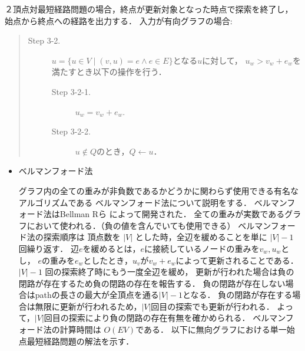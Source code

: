 \documentclass[12pt]{optlab-bachelor}
\begin{document}
２頂点対最短経路問題の場合，終点が更新対象となった時点で探索を終了し，
始点から終点への経路を出力する．
入力が有向グラフの場合:
\begin{quote}
\begin{description}
\item[Step 3-2.] $u = \{ u \in V \mid (v,u) = e \land e \in E \}$となる$u$に対して，
$u_w > v_w + e_w$を満たすとき以下の操作を行う．
\begin{description}
  \item[Step 3-2-1.] $u_w = v_w + e_w$.
  \item[Step 3-2-2.] $u \notin Q$のとき，$Q \leftarrow u$．
\end{description}
\end{description}
\end{quote}

\begin{itemize}
  \item ベルマンフォード法

  グラフ内の全ての重みが非負数であるかどうかに関わらず使用できる有名なアルゴリズムである
  ベルマンフォード法について説明をする．
  ベルマンフォード法はBellman Rら \cite{Bellman}によって開発された．
  全ての重みが実数であるグラフにおいて使われる．（負の値を含んでいても使用できる）
  ベルマンフォード法の探索順序は
  頂点数を $|V|$ とした時，全辺を緩めることを単に $|V|-1$ 回繰り返す．
  辺$e$を緩めるとは，$e$に接続しているノードの重みを$v_w,u_w$とし，
  $e$の重みを$e_w$としたとき，$u_v$が$v_w+e_w$によって更新されることである．
  $|V|-1$ 回の探索終了時にもう一度全辺を緩め，
  更新が行われた場合は負の閉路が存在するため負の閉路の存在を報告する．
  負の閉路が存在しない場合はpathの長さの最大が全頂点を通る$|V|-1$となる．
  負の閉路が存在する場合は無限に更新が行われるため，$|V|$回目の探索でも更新が行われる．
  よって，$|V|$回目の探索により負の閉路の存在有無を確かめられる．
  ベルマンフォード法の計算時間は $O(EV)$である．
  以下に無向グラフにおける単一始点最短経路問題の解法を示す．


\end{itemize}
\end{document}
